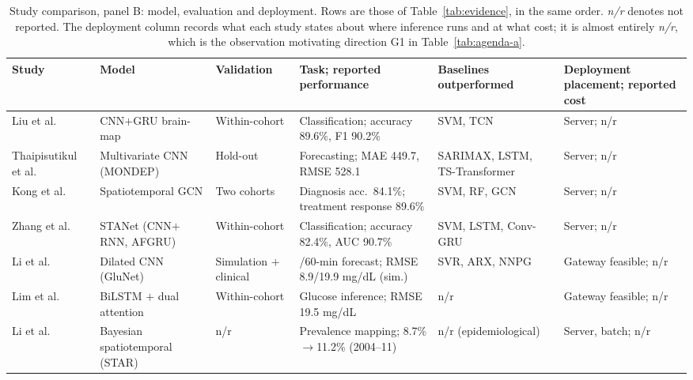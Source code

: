 \documentclass[journal]{IEEEtran}
\newif\ifsubmission
\begin{document}
\ifsubmission\else
\begin{table}[p]
\centering
\caption{Study comparison, panel B: model, evaluation and deployment. Rows are those of Table~\ref{tab:evidence}, in the same order. \emph{n/r} denotes not reported. The deployment column records what each study states about where inference runs and at what cost; it is almost entirely \emph{n/r}, which is the observation motivating direction G1 in Table~\ref{tab:agenda-a}.}
\label{tab:evidence-b}
\scriptsize
\setlength{\tabcolsep}{3pt}
\renewcommand{\arraystretch}{1.12}
\begin{tabularx}{\textwidth}{>{\raggedright\arraybackslash}p{1.9cm} >{\raggedright\arraybackslash}p{2.7cm} >{\raggedright\arraybackslash}p{1.9cm} >{\raggedright\arraybackslash}X >{\raggedright\arraybackslash}p{2.9cm} >{\raggedright\arraybackslash}p{2.9cm}}
\toprule
\textbf{Study} & \textbf{Model} & \textbf{Validation} & \textbf{Task; reported performance} & \textbf{Baselines outperformed} & \textbf{Deployment placement; reported cost} \\
\midrule
Liu et al.~\cite{2} & CNN$+$GRU brain-map & Within-cohort & Classification; accuracy 89.6\%, F1 90.2\% & SVM, TCN & Server; n/r \\
\addlinespace[1pt]
\rowcolor{tablestripe}Thaipisutikul et al.~\cite{3} & Multivariate CNN (MONDEP) & Hold-out & Forecasting; MAE 449.7, RMSE 528.1 & SARIMAX, LSTM, TS-Transformer & Server; n/r \\
\addlinespace[1pt]
Kong et al.~\cite{4} & Spatiotemporal GCN & Two cohorts & Diagnosis acc.\ 84.1\%; treatment response 89.6\% & SVM, RF, GCN & Server; n/r \\
\addlinespace[1pt]
\rowcolor{tablestripe}Zhang et al.~\cite{9} & STANet (CNN$+$RNN, AFGRU) & Within-cohort & Classification; accuracy 82.4\%, AUC 90.7\% & SVM, LSTM, Conv-GRU & Server; n/r \\
\addlinespace[1pt]
Li et al.~\cite{Li2020GluNet} & Dilated CNN (GluNet) & Simulation $+$ clinical & 30/60-min forecast; RMSE 8.9/19.9 mg/dL (sim.) & SVR, ARX, NNPG & Gateway feasible; n/r \\
\addlinespace[1pt]
\rowcolor{tablestripe}Lim et al.~\cite{Lim2025VirtualCGM} & BiLSTM $+$ dual attention & Within-cohort & Glucose inference; RMSE 19.5 mg/dL & n/r & Gateway feasible; n/r \\
\addlinespace[1pt]
Li et al.~\cite{XiaoLi2016DiabetesSpatiotemporal} & Bayesian spatiotemporal (STAR) & n/r & Prevalence mapping; 8.7\%$\to$11.2\% (2004--11) & n/r (epidemiological) & Server, batch; n/r \\

\end{tabularx}
\end{table}
\end{document}
